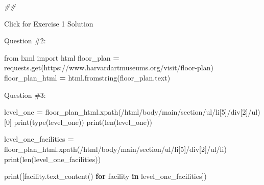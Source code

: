 \documentclass[
]{book}
\newenvironment{Shaded}{\begin{snugshade}}{\end{snugshade}}
\newcommand{\BuiltInTok}[1]{#1}
\newcommand{\CommentTok}[1]{\textcolor[rgb]{0.56,0.35,0.01}{\textit{#1}}}
\newcommand{\ControlFlowTok}[1]{\textcolor[rgb]{0.13,0.29,0.53}{\textbf{#1}}}
\newcommand{\DecValTok}[1]{\textcolor[rgb]{0.00,0.00,0.81}{#1}}
\newcommand{\ImportTok}[1]{#1}
\newcommand{\KeywordTok}[1]{\textcolor[rgb]{0.13,0.29,0.53}{\textbf{#1}}}
\newcommand{\NormalTok}[1]{#1}
\newcommand{\OperatorTok}[1]{\textcolor[rgb]{0.81,0.36,0.00}{\textbf{#1}}}
\newcommand{\StringTok}[1]{\textcolor[rgb]{0.31,0.60,0.02}{#1}}
\begin{document}
\begin{Shaded}
\begin{Highlighting}[]
\CommentTok{\#\#}
\end{Highlighting}
\end{Shaded}

{Click for Exercise 1 Solution}

\begin{alert}

Question \#2:

\begin{Shaded}
\begin{Highlighting}[]
\ImportTok{from}\NormalTok{ lxml }\ImportTok{import}\NormalTok{ html}
\NormalTok{floor\_plan }\OperatorTok{=}\NormalTok{ requests.get(}\StringTok{\textquotesingle{}https://www.harvardartmuseums.org/visit/floor{-}plan\textquotesingle{}}\NormalTok{)}
\NormalTok{floor\_plan\_html }\OperatorTok{=}\NormalTok{ html.fromstring(floor\_plan.text)}
\end{Highlighting}
\end{Shaded}

Question \#3:

\begin{Shaded}
\begin{Highlighting}[]
\NormalTok{level\_one }\OperatorTok{=}\NormalTok{ floor\_plan\_html.xpath(}\StringTok{\textquotesingle{}/html/body/main/section/ul/li[5]/div[2]/ul\textquotesingle{}}\NormalTok{)[}\DecValTok{0}\NormalTok{]}
\BuiltInTok{print}\NormalTok{(}\BuiltInTok{type}\NormalTok{(level\_one))}
\BuiltInTok{print}\NormalTok{(}\BuiltInTok{len}\NormalTok{(level\_one))}
\end{Highlighting}
\end{Shaded}

\begin{Shaded}
\begin{Highlighting}[]
\NormalTok{level\_one\_facilities }\OperatorTok{=}\NormalTok{ floor\_plan\_html.xpath(}\StringTok{\textquotesingle{}/html/body/main/section/ul/li[5]/div[2]/ul/li\textquotesingle{}}\NormalTok{)}
\BuiltInTok{print}\NormalTok{(}\BuiltInTok{len}\NormalTok{(level\_one\_facilities))}
\end{Highlighting}
\end{Shaded}

\begin{Shaded}
\begin{Highlighting}[]
\BuiltInTok{print}\NormalTok{([facility.text\_content() }\ControlFlowTok{for}\NormalTok{ facility }\KeywordTok{in}\NormalTok{ level\_one\_facilities])}
\end{Highlighting}
\end{Shaded}


\end{alert}
\end{document}
